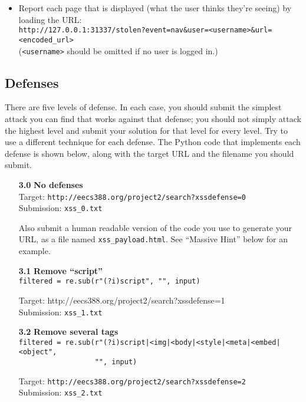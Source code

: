 \documentclass[letterpaper,12pt]{article}
\begin{document}
{\begin{itemize}
\item Report each page that is displayed (what the user thinks they're seeing) by loading the URL:\\
\texttt{http://127.0.0.1:31337/stolen?event=nav\&user=<username>\&url=<encoded\_url>}\\
(\texttt{<username>} should be omitted if no user is logged in.)
\end{itemize}

\newpage
\subsection*{Defenses} 

There are five levels of defense.  In each case, you should submit the simplest attack you can find that works against that defense; you should not simply attack the highest level and submit your solution for that level for every level. Try to use a different technique for each defense.  The Python code that implements each defense is shown below, along with the target URL and the filename you should submit.

\begin{enumerate}
\item[\bf 3.0] \textbf{No defenses}\\
Target: \texttt{http://eecs388.org/project2/search?xssdefense=0}\\
Submission: \texttt{xss\_0.txt}
\smallskip

Also submit a human readable version of the code you use to generate your URL, as a file named \texttt{xss\_payload.html}.  See ``Massive Hint'' below for an example.

\item[\bf 3.1] \textbf{Remove ``script''}\\
\verb+filtered = re.sub(r"(?i)script", "", input)+
\smallskip

Target: http://eecs388.org/project2/search?xssdefense=1\\
Submission: \texttt{xss\_1.txt}

\item[\bf 3.2] \textbf{Remove several tags}\\
\verb+filtered = re.sub(r"(?i)script|<img|<body|<style|<meta|<embed|<object",+\\
\verb+                  "", input)+
\smallskip

Target: \texttt{http://eecs388.org/project2/search?xssdefense=2}\\
Submission: \texttt{xss\_2.txt}


\end{enumerate}}
\end{document}
